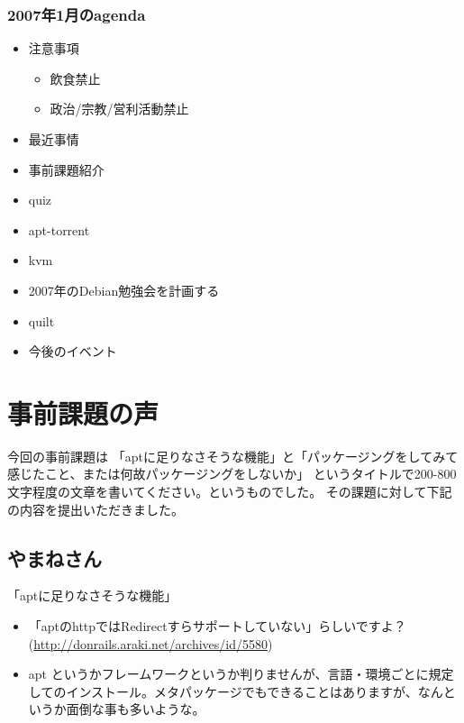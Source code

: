 \documentclass[cjk,dvipdfmx]{beamer}
\begin{document}
\begin{frame}
 \frametitle{2007年1月のagenda}
\begin{minipage}[t]{0.4\hsize}
  \begin{itemize}
  \item 注意事項
	\begin{itemize}
	 \item 飲食禁止
	 \item 政治/宗教/営利活動禁止
	\end{itemize}
  \item 最近事情
  \item 事前課題紹介
  \item quiz
 \end{itemize}
\end{minipage} 
\begin{minipage}[t]{0.4\hsize}
 \begin{itemize}
  \item apt-torrent
  \item kvm
  \item 2007年のDebian勉強会を計画する
  \item quilt
  \item 今後のイベント
 \end{itemize}
\end{minipage}
\end{frame}

\section{事前課題の声}
\begin{frame}

 今回の事前課題は
「aptに足りなさそうな機能」と「パッケージングをしてみて感じたこと、または何故パッケージングをしないか」
 というタイトルで200-800文字程度の文章を書いてください。というものでした。
 その課題に対して下記の内容を提出いただきました。
\end{frame}


\subsection{やまねさん}
\begin{frame}{「aptに足りなさそうな機能」}

 \begin{itemize}
 \item 「aptのhttpではRedirectすらサポートしていない」らしいですよ？(\url{http://donrails.araki.net/archives/id/5580})
 \item apt というかフレームワークというか判りませんが、言語・環境ごとに規定してのインストール。メタパッケージでもできることはありますが、なんというか面倒な事も多いような。
 \end{itemize}
\end{frame}
\end{document}
